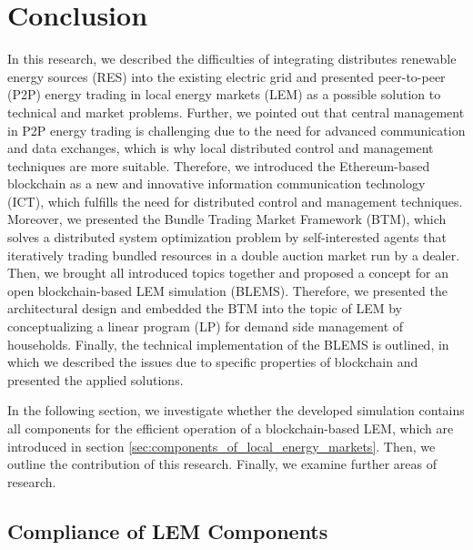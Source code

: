 \section{Conclusion}
In this research, we described the difficulties of integrating distributes renewable energy sources (RES) into 
the existing electric grid and presented peer-to-peer (P2P) energy trading in local energy markets (LEM)
as a possible solution to technical and market problems. Further, we pointed out that central
management in P2P energy trading is challenging due to the need for advanced communication and data exchanges,
which is why local distributed control and management techniques are more suitable.
Therefore, we introduced the Ethereum-based blockchain as a new and innovative information communication technology (ICT), 
which fulfills the need for distributed control and management techniques.
Moreover, we presented the Bundle Trading Market Framework (BTM), which solves a distributed system
optimization problem by self-interested agents that iteratively trading bundled resources in a double
auction market run by a dealer. 
Then, we brought all introduced topics together and proposed a concept for an open blockchain-based 
LEM simulation (BLEMS). Therefore, we presented the architectural design and embedded the BTM into the topic of LEM
by conceptualizing a linear program (LP) for demand side management of households. 
Finally, the technical implementation of the BLEMS is outlined, in which we described the issues due to
specific properties of blockchain and presented the applied solutions.

In the following section, we investigate whether the developed simulation contains all components for the efficient 
operation of a blockchain-based LEM, which are introduced in section \ref{sec:components_of_local_energy_markets}. 
Then, we outline the contribution of this research. Finally, we examine further areas of research.

\subsection{Compliance of LEM Components}
\label{sec:compliance_of_components}

